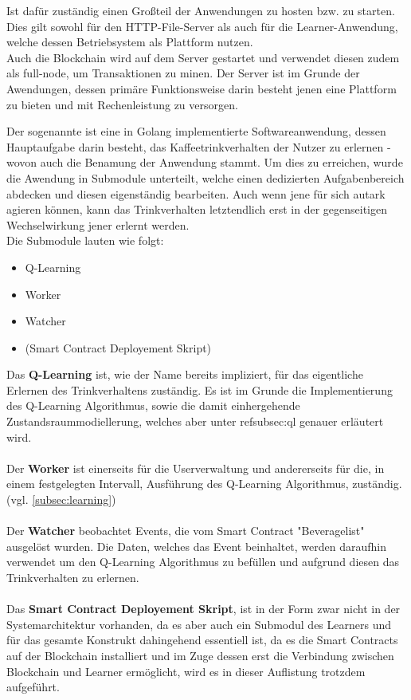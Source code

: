 Ist dafür zuständig einen Großteil der Anwendungen zu hosten bzw. zu starten.
Dies gilt sowohl für den HTTP-File-Server als auch für die Learner-Anwendung, welche dessen Betriebsystem als Plattform nutzen.\\
Auch die Blockchain wird auf dem Server gestartet und verwendet diesen zudem als full-node, um Transaktionen zu minen.
Der Server ist im Grunde der Awendungen, dessen primäre Funktionsweise darin besteht jenen eine Plattform zu bieten und mit Rechenleistung zu versorgen.

Der sogenannte  ist eine in Golang implementierte Softwareanwendung, dessen Hauptaufgabe darin besteht, das Kaffeetrinkverhalten der Nutzer zu erlernen - wovon auch die Benamung der Anwendung stammt.
Um dies zu erreichen, wurde die Awendung in Submodule unterteilt, welche einen dedizierten Aufgabenbereich abdecken und diesen eigenständig bearbeiten. 
Auch wenn jene für sich autark agieren können, kann das Trinkverhalten letztendlich erst in der gegenseitigen Wechselwirkung jener erlernt werden. \\
Die Submodule lauten wie folgt:
\begin{itemize}
	\item Q-Learning
	\item Worker
	\item Watcher
	\item (Smart Contract Deployement Skript)
\end{itemize}

Das \textbf{Q-Learning} ist, wie der Name bereits impliziert, für das eigentliche Erlernen des Trinkverhaltens zuständig. Es ist im Grunde die Implementierung des Q-Learning Algorithmus, sowie die damit einhergehende Zustandsraummodiellerung, welches aber unter ref{subsec:ql} genauer erläutert wird.
\\\\
Der \textbf{Worker} ist einerseits für die Userverwaltung und andererseits für die, in einem festgelegten Intervall, Ausführung des Q-Learning Algorithmus, zuständig. (vgl. \ref{subsec:learning})
\\\\
Der \textbf{Watcher} beobachtet Events, die vom Smart Contract "Beveragelist" ausgelöst wurden. Die Daten, welches das Event beinhaltet, werden daraufhin verwendet um den Q-Learning Algorithmus zu befüllen und aufgrund diesen das Trinkverhalten zu erlernen.
\\\\
Das \textbf{Smart Contract Deployement Skript}, ist in der Form zwar nicht in der Systemarchitektur vorhanden, da es aber auch ein Submodul des Learners und für das gesamte Konstrukt dahingehend essentiell ist, da es die Smart Contracts auf der Blockchain installiert und im Zuge dessen erst die Verbindung zwischen Blockchain und Learner ermöglicht, wird es in dieser Auflistung trotzdem aufgeführt. 

